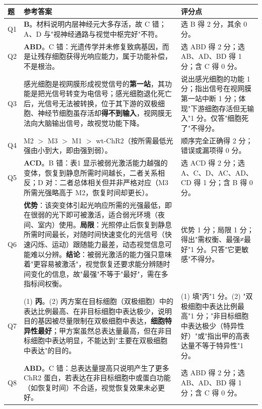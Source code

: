 \documentclass[UTF8,a4paper,11pt]{ctexart}
\begin{document}
\begin{longtable}{@{}p{0.9cm}p{9.6cm}p{4.2cm}@{}}
\toprule
\textbf{题} & \textbf{参考答案} & \textbf{评分点} \\
\midrule
\endhead
Q1 & \textbf{B}。材料说明内层神经元大多存活，故 C 错；A、D 与"视神经通路与视觉中枢完好"不符。 & 选 B 得 2 分，其余 0 分。 \\
\addlinespace
Q2 & \textbf{ABD}。C 错：光遗传学并未修复致病基因，而是让残存细胞获得光响应能力，属于功能补偿，不是根治。 & 选 ABD 得 2 分；选 AB、AD、BD 得 1 分；含 C 得 0 分。 \\
\addlinespace
Q3 & 感光细胞是视网膜形成视觉信号的\textbf{第一站}，其功能是把光信号转变为电信号；感光细胞退化死亡后，光信号无法被转换，位于其下游的双极细胞、神经节细胞虽存活却\textbf{得不到输入}，视网膜无法向大脑输出信号，故视觉功能下降。 & 说出感光细胞的功能 1 分；指出信号在视网膜第一站中断 1 分；体现"下游细胞存活但无输入"1 分。仅答"细胞死了"不得分。 \\
\addlinespace
Q4 & M2 $>$ M3 $>$ M1 $>$ wt-ChR2（按所需最低光强由小到大，即由强到弱）。 & 顺序完全正确得 2 分；错误或漏项得 0 分。 \\
\addlinespace
Q5 & \textbf{ACD}。B 错：表1 显示被弱光激活能力越强的变体，恢复到静息所需时间越长，二者关系相反；D 对：二者总体相关但并非严格对应（M3 所需光强略高于 M2，恢复时间却更长）。 & 选 ACD 得 2 分；选 A、C、D、AC、AD、CD 得 1 分；含 B 得 0 分。 \\
\addlinespace
Q6 & \textbf{优势}：该突变体引起光响应所需的光强最低，即在很弱的光下即可被激活，适合弱光环境（夜间、室内）使用。\textbf{局限}：光照停止后恢复到静息所需时间最长，对随时间快速变化的光信号（快速闪烁、运动）跟随能力最差，动态视觉信息可能难以分辨。\textbf{结论}：被弱光激活的能力强只意味着"更容易被激活"，视觉恢复还要求能分辨随时间变化的信息，故"最强"不等于"最好"，需在多指标间权衡。 & 优势 1 分；局限 1 分；得出"需权衡、最强≠最好"1 分。只答"它更敏感"不得分。 \\
\addlinespace
Q7 & (1) \textbf{丙}。(2) 丙方案在目标细胞（双极细胞）中的表达比例最高、在非目标细胞中表达极少，说明目的基因被尽量限制在双极细胞中表达，\textbf{细胞特异性最好}；甲方案虽然总表达量最高，但在非目标细胞中表达明显，不能达到"主要在双极细胞中表达"的目的。 & (1) 填"丙"1 分。(2) "双极细胞中表达比例最高"1 分；"非目标细胞中表达极少（特异性好）"或"指出甲的高表达量不等于特异性"1 分。 \\
\addlinespace
Q8 & \textbf{ABD}。C 错：总表达量提高只说明产生了更多 ChR2 蛋白，若表达在非目标细胞中或蛋白功能（如恢复时间）不合适，视觉恢复效果未必更好。 & 选 ABD 得 2 分；选 AB、AD、BD 得 1 分；含 C 得 0 分。 \\

\end{longtable}
\end{document}
